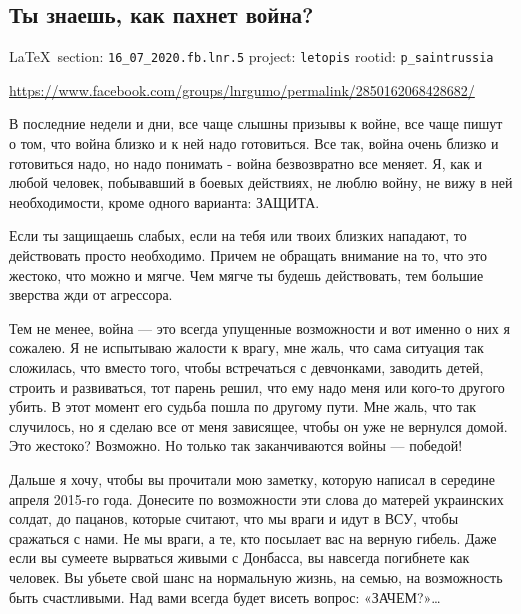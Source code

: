  
 
  
\subsection{Ты знаешь, как пахнет война?}
\label{sec:16_07_2020.fb.lnr.5}
\vspace{0.5cm}
{\ifDEBUG\small\LaTeX~section: \verb|16_07_2020.fb.lnr.5| project: \verb|letopis| rootid: \verb|p_saintrussia|\fi}
\vspace{0.5cm}
  
\url{https://www.facebook.com/groups/lnrgumo/permalink/2850162068428682/}

В последние недели и дни, все чаще слышны призывы к войне, все чаще пишут о
том, что война близко и к ней надо готовиться. Все так, война очень близко и
готовиться надо, но надо понимать - война безвозвратно все меняет. Я, как и
любой человек, побывавший в боевых действиях, не люблю войну, не вижу в ней
необходимости, кроме одного варианта: ЗАЩИТА.

Если ты защищаешь слабых, если на тебя или твоих близких нападают, то
действовать просто необходимо. Причем не обращать внимание на то, что это
жестоко, что можно и мягче. Чем мягче ты будешь действовать, тем большие
зверства жди от агрессора.

Тем не менее, война --- это всегда упущенные возможности и вот именно о них я
сожалею. Я не испытываю жалости к врагу, мне жаль, что сама ситуация так
сложилась, что вместо того, чтобы встречаться с девчонками, заводить детей,
строить и развиваться, тот парень решил, что ему надо меня или кого-то другого
убить. В этот момент его судьба пошла по другому пути. Мне жаль, что так
случилось, но я сделаю все от меня зависящее, чтобы он уже не вернулся домой.
Это жестоко? Возможно. Но только так заканчиваются войны --- победой!

Дальше я хочу, чтобы вы прочитали мою заметку, которую написал в середине
апреля 2015-го года. Донесите по возможности эти слова до матерей украинских
солдат, до пацанов, которые считают, что мы враги и идут в ВСУ, чтобы сражаться
с нами. Не мы враги, а те, кто посылает вас на верную гибель. Даже если вы
сумеете вырваться живыми с Донбасса, вы навсегда погибнете как человек. Вы
убьете свой шанс на нормальную жизнь, на семью, на возможность быть
счастливыми. Над вами всегда будет висеть вопрос: «ЗАЧЕМ?»…


